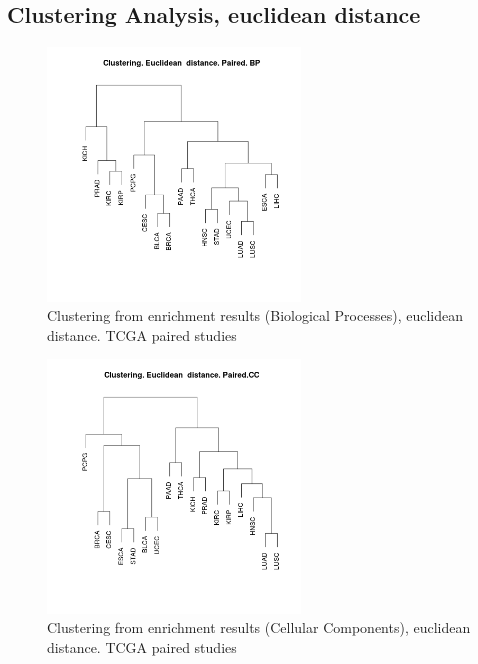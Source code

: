 \documentclass[a4paper,12pt]{article}
\begin{document}
\subsection{Clustering Analysis, euclidean distance}
\begin{figure}[!h] 
\centering 
\includegraphics[width=0.6\textwidth]{img/cluster_euclideand_bp_paired.png} 
\caption{Clustering from enrichment results (Biological Processes), euclidean distance.  TCGA paired studies} 
\label{figCLUST_eu_bp_paired} 
\end{figure} 

\begin{figure}[!h] 
\centering 
\includegraphics[width=0.6\textwidth]{img/cluster_euclideand_cc_paired.png} 
\caption{Clustering from enrichment results (Cellular Components), euclidean distance.  TCGA paired studies} 
\label{figCLUST_eu_cc_paired} 
\end{figure} 
\end{document}
